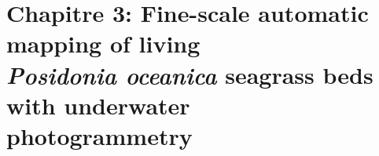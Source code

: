 \renewcommand*{\theHsection}{Herbiers.\the\value{section}}

\chapter[Fine-scale automatic mapping of living \textit{Posidonia oceanica} seagrass beds with underwater photogrammetry]{Chapitre 3: Fine-scale automatic mapping of living\\ \textit{Posidonia oceanica} seagrass beds with underwater\\ photogrammetry} \label{chapitre3-herbiers}

\pagestyle{main}


